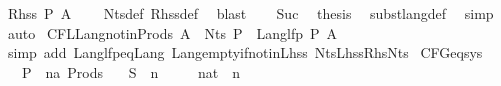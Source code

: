 \begin{isabellebody}
\ {\isachardoublequoteopen}Rhss\ P\ A\ {\isacharequal}{\kern0pt}\ {\isacharbraceleft}{\kern0pt}{\isacharbraceright}{\kern0pt}{\isachardoublequoteclose}\ \isamarkupfalse%
\ Nts{\isacharunderscore}{\kern0pt}def\ Rhss{\isacharunderscore}{\kern0pt}def\ \isamarkupfalse%
\ blast\isanewline
\ \ \isamarkupfalse%
\ Suc\ \isamarkupfalse%
\ {\isacharquery}{\kern0pt}thesis\ \isamarkupfalse%
\ subst{\isacharunderscore}{\kern0pt}lang{\isacharunderscore}{\kern0pt}def\ \isamarkupfalse%
\ simp\isanewline
{}\isamarkupfalse%
\ auto%
\endisatagproof
{\isafoldproof}%
%
\isadelimproof
\isanewline
%
\endisadelimproof
\isanewline
{}\isamarkupfalse%
\ CFL{\isacharunderscore}{\kern0pt}Lang{\isacharunderscore}{\kern0pt}not{\isacharunderscore}{\kern0pt}in{\isacharunderscore}{\kern0pt}Prods{\isacharcolon}{\kern0pt}\ {\isachardoublequoteopen}A\ {\isasymnotin}\ Nts\ P\ {\isasymLongrightarrow}\ Lang{\isacharunderscore}{\kern0pt}lfp\ P\ A\ {\isacharequal}{\kern0pt}\ {\isacharbraceleft}{\kern0pt}{\isacharbraceright}{\kern0pt}{\isachardoublequoteclose}\isanewline
%
\isadelimproof
\ \ %
\endisadelimproof
%
\isatagproof
{}\isamarkupfalse%
\ {\isacharparenleft}{\kern0pt}simp\ add{\isacharcolon}{\kern0pt}\ Lang{\isacharunderscore}{\kern0pt}lfp{\isacharunderscore}{\kern0pt}eq{\isacharunderscore}{\kern0pt}Lang\ Lang{\isacharunderscore}{\kern0pt}empty{\isacharunderscore}{\kern0pt}if{\isacharunderscore}{\kern0pt}notin{\isacharunderscore}{\kern0pt}Lhss\ Nts{\isacharunderscore}{\kern0pt}Lhss{\isacharunderscore}{\kern0pt}Rhs{\isacharunderscore}{\kern0pt}Nts{\isacharparenright}{\kern0pt}%
\endisatagproof
{\isafoldproof}%
%
\isadelimproof
\isanewline
%
\endisadelimproof
\isanewline
\isanewline
{}\isamarkupfalse%
\ CFG{\isacharunderscore}{\kern0pt}eq{\isacharunderscore}{\kern0pt}sys\ {\isacharequal}{\kern0pt}\isanewline
\ \ \ P\ {\isacharcolon}{\kern0pt}{\isacharcolon}{\kern0pt}\ {\isachardoublequoteopen}{\isacharparenleft}{\kern0pt}{\isacharprime}{\kern0pt}n{\isacharcomma}{\kern0pt}{\isacharprime}{\kern0pt}a{\isacharparenright}{\kern0pt}\ Prods{\isachardoublequoteclose}\isanewline
\ \ \ S\ {\isacharcolon}{\kern0pt}{\isacharcolon}{\kern0pt}\ {\isacharprime}{\kern0pt}n\isanewline
\ \ \ {\isasymgamma}\ {\isacharcolon}{\kern0pt}{\isacharcolon}{\kern0pt}\ {\isachardoublequoteopen}nat\ {\isasymRightarrow}\ {\isacharprime}{\kern0pt}n{\isachardoublequoteclose}\isanewline

\end{isabellebody}
